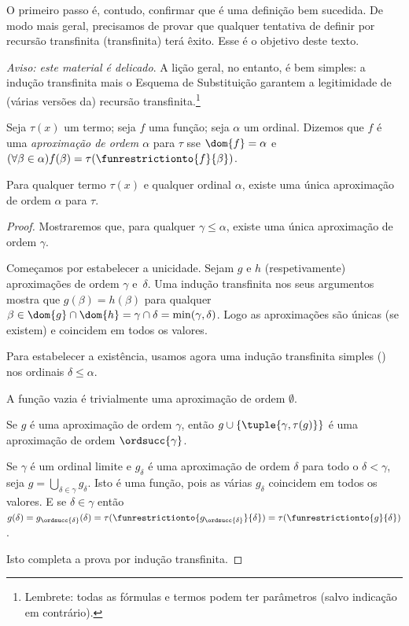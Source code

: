 \documentclass[../../../include/open-logic-section]{subfiles}
\begin{document}

O primeiro passo é, contudo, confirmar que
 é uma definição bem sucedida. De modo mais geral,
precisamos de provar que qualquer tentativa de definir por recursão transfinita
(transfinita) terá êxito. Esse é o objetivo deste texto.

\emph{Aviso: este material é delicado}. A lição geral,
no entanto, é bem simples: a indução transfinita mais o Esquema de Substituição
garantem a legitimidade de (várias versões da) recursão
transfinita.\footnote{Lembrete: todas as fórmulas e termos podem ter parâmetros (salvo indicação em contrário).}

\begin{defn}
	Seja $\tau(x)$ um termo; seja $f$ uma função; seja $\alpha$ um ordinal. Dizemos que $f$ é uma \emph{aproximação de ordem $\alpha$} para $\tau$ sse $\dom{f} = \alpha$ e $(\forall \beta \in \alpha)f(\beta) = \tau(\funrestrictionto{f}{\beta})$.
\end{defn}

\begin{lem}
Para qualquer termo $\tau(x)$ e qualquer ordinal $\alpha$, existe uma única aproximação de ordem $\alpha$ para $\tau$.
\end{lem}
\begin{proof}
Mostraremos que, para qualquer $\gamma \leq \alpha$, existe uma única
aproximação de ordem $\gamma$. 

Começamos por estabelecer a unicidade. Sejam $g$ e $h$ (respetivamente) aproximações de ordem $\gamma$ e~$\delta$. Uma indução transfinita nos seus argumentos mostra que
$g(\beta) = h(\beta)$ para qualquer $\beta \in \dom{g} \cap \dom{h} =
\gamma \cap \delta = \min(\gamma, \delta)$. Logo as aproximações são únicas (se existem) e coincidem em todos os valores.

Para estabelecer a existência, usamos agora uma indução transfinita simples
() nos ordinais
$\delta \leq \alpha$. 

A função vazia é trivialmente uma aproximação de ordem $\emptyset$. 

Se $g$ é uma aproximação de ordem $\gamma$, então $g \cup
\{\tuple{\gamma, \tau(g)}\}$ é uma aproximação de ordem $\ordsucc{\gamma}$.

Se $\gamma$ é um ordinal limite e $g_\delta$ é uma aproximação de ordem $\delta$ para todo o $\delta < \gamma$, seja $g = \bigcup_{\delta \in \gamma} g_\delta$. Isto
é uma função, pois as várias $g_\delta$ coincidem em todos os valores. E
se $\delta \in \gamma$ então $g(\delta) = g_{\ordsucc{\delta}}(\delta) =
\tau(\funrestrictionto{g_{\ordsucc{\delta}}}{\delta}) =
\tau(\funrestrictionto{g}{\delta})$.

Isto completa a prova por indução transfinita.
\end{proof}
\end{document}
